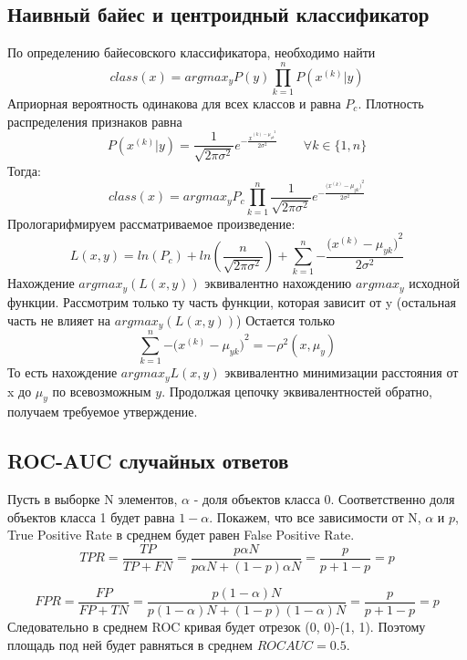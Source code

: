 \documentclass[12pt]{article}
\begin{document}
\subsection*{Наивный байес и центроидный классификатор}

По определению байесовского классификатора,
необходимо найти $$class(x) =
argmax_y {P(y)\prod_{k=1}^n}P(x^{(k)}|y)$$
Априорная вероятность одинакова для всех классов и равна $P_c$.
Плотность распределения признаков равна
$$P(x^{(k)}|y) = \frac{1}{\sqrt{2 \pi \sigma^2}}
e^{-\frac{x^{(k) - \mu_{yk}}^2}{2\sigma^2}}
\qquad \forall k \in \{ 1, n\}$$
Тогда:
$$ class(x) = argmax_y {P_c
\prod_{k=1}^n}\frac{1}{\sqrt{2 \pi \sigma^2}}
e^{-\frac {({x^{(k)} - \mu_{yk})}^2}{2\sigma^2}} $$
Прологарифмируем рассматриваемое произведение:
$$ L(x, y) = ln(P_c) + ln(\frac{n}{\sqrt{2 \pi \sigma^2}})
+ \sum_{k=1}^n {-\frac {({x^{(k)} - \mu_{yk})}^2}{2\sigma^2}} $$
Нахождение $argmax_y(L(x, y))$ эквивалентно нахождению
$argmax_y$ исходной функции.
Рассмотрим только ту часть функции, которая зависит от y
(остальная часть не влияет на $argmax_y(L(x, y))$)
Остается только
$$ \sum_{k=1}^n {-{(x^{(k)} - \mu_{yk}})}^2 = -\rho^2(x, \mu_y) $$
То есть нахождение $argmax_yL(x,y)$ эквивалентно минимизации расстояния от x до $\mu_y$ по всевозможным $y$. Продолжая цепочку эквивалентностей обратно, получаем требуемое утверждение.

\subsection*{ROC-AUC случайных ответов}
Пусть в выборке N элементов, $\alpha$ - доля объектов класса 0.
Соответственно доля объектов класса 1 будет равна $1 - \alpha$.
Покажем, что все зависимости от N, $\alpha$ и $p$, True Positive Rate в среднем будет равен False Positive Rate.
$$ TPR = \frac{TP}{TP + FN} =
\frac{p \alpha N}{p \alpha N + (1 - p) \alpha N} =
\frac{p}{p + 1 - p} = p $$


$$ FPR = \frac{FP}{FP + TN} =
\frac{p (1 - \alpha)N}{p (1 - \alpha)N + (1 - p) (1 - \alpha)N} =
\frac{p}{p + 1 - p} = p $$
Следовательно в среднем ROC кривая будет отрезок (0, 0)-(1, 1).
Поэтому площадь под ней будет равняться в среднем
$ROC AUC = 0.5$.
\end{document}
